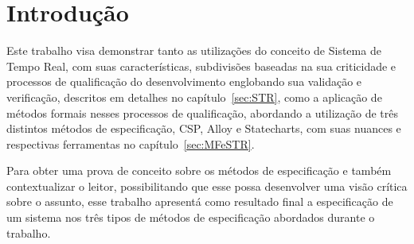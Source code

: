 \section{Introdução}
Este trabalho visa demonstrar tanto as utilizações do conceito de Sistema de Tempo Real,
com suas características, subdivisões baseadas na sua criticidade e processos de qualificação
do desenvolvimento englobando sua validação e verificação, descritos em detalhes no capítulo~\ref{sec:STR},
como a aplicação de métodos formais nesses processos de qualificação, abordando a utilização de três
distintos métodos de especificação, CSP, Alloy e Statecharts, com suas nuances e respectivas ferramentas
no capítulo~\ref{sec:MFeSTR}.

Para obter uma prova de conceito sobre os métodos de especificação e também contextualizar o leitor,
possibilitando que esse possa desenvolver uma visão crítica sobre o assunto, esse trabalho apresentá
como resultado final a especificação de um sistema nos três tipos de métodos de especificação
abordados durante o trabalho.
